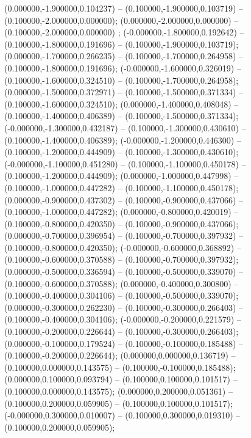  (0.000000,-1.900000,0.104237) -- (0.100000,-1.900000,0.103719) -- (0.100000,-2.000000,0.000000);
 (0.000000,-2.000000,0.000000) -- (0.100000,-2.000000,0.000000) ;
 (-0.000000,-1.800000,0.192642) -- (0.100000,-1.800000,0.191696) -- (0.100000,-1.900000,0.103719);
 (0.000000,-1.700000,0.266235) -- (0.100000,-1.700000,0.264958) -- (0.100000,-1.800000,0.191696);
 (-0.000000,-1.600000,0.326019) -- (0.100000,-1.600000,0.324510) -- (0.100000,-1.700000,0.264958);
 (0.000000,-1.500000,0.372971) -- (0.100000,-1.500000,0.371334) -- (0.100000,-1.600000,0.324510);
 (0.000000,-1.400000,0.408048) -- (0.100000,-1.400000,0.406389) -- (0.100000,-1.500000,0.371334);
 (-0.000000,-1.300000,0.432187) -- (0.100000,-1.300000,0.430610) -- (0.100000,-1.400000,0.406389);
 (-0.000000,-1.200000,0.446300) -- (0.100000,-1.200000,0.444909) -- (0.100000,-1.300000,0.430610);
 (-0.000000,-1.100000,0.451280) -- (0.100000,-1.100000,0.450178) -- (0.100000,-1.200000,0.444909);
 (0.000000,-1.000000,0.447998) -- (0.100000,-1.000000,0.447282) -- (0.100000,-1.100000,0.450178);
 (0.000000,-0.900000,0.437302) -- (0.100000,-0.900000,0.437066) -- (0.100000,-1.000000,0.447282);
 (0.000000,-0.800000,0.420019) -- (0.100000,-0.800000,0.420350) -- (0.100000,-0.900000,0.437066);
 (0.000000,-0.700000,0.396954) -- (0.100000,-0.700000,0.397932) -- (0.100000,-0.800000,0.420350);
 (-0.000000,-0.600000,0.368892) -- (0.100000,-0.600000,0.370588) -- (0.100000,-0.700000,0.397932);
 (0.000000,-0.500000,0.336594) -- (0.100000,-0.500000,0.339070) -- (0.100000,-0.600000,0.370588);
 (0.000000,-0.400000,0.300800) -- (0.100000,-0.400000,0.304106) -- (0.100000,-0.500000,0.339070);
 (0.000000,-0.300000,0.262230) -- (0.100000,-0.300000,0.266403) -- (0.100000,-0.400000,0.304106);
 (-0.000000,-0.200000,0.221579) -- (0.100000,-0.200000,0.226644) -- (0.100000,-0.300000,0.266403);
 (0.000000,-0.100000,0.179524) -- (0.100000,-0.100000,0.185488) -- (0.100000,-0.200000,0.226644);
 (0.000000,0.000000,0.136719) -- (0.100000,0.000000,0.143575) -- (0.100000,-0.100000,0.185488);
 (0.000000,0.100000,0.093794) -- (0.100000,0.100000,0.101517) -- (0.100000,0.000000,0.143575);
 (0.000000,0.200000,0.051361) -- (0.100000,0.200000,0.059905) -- (0.100000,0.100000,0.101517);
 (-0.000000,0.300000,0.010007) -- (0.100000,0.300000,0.019310) -- (0.100000,0.200000,0.059905);
